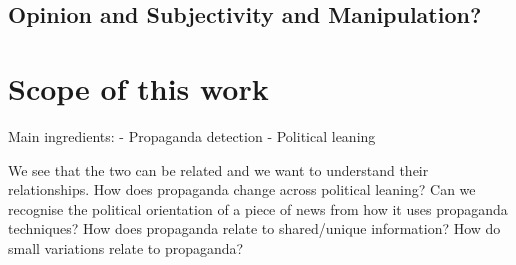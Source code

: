 \subsection{Opinion and Subjectivity and Manipulation?}

\section{Scope of this work}

Main ingredients:
- Propaganda detection
- Political leaning

We see that the two can be related and we want to understand their relationships.
How does propaganda change across political leaning?
Can we recognise the political orientation of a piece of news from how it uses propaganda techniques?
How does propaganda relate to shared/unique information? How do small variations relate to propaganda?
